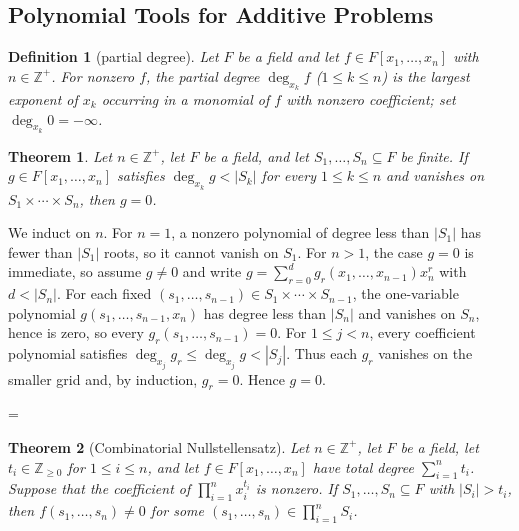 \documentclass[11pt]{article}
\makeatletter
\theoremstyle{ntstyle}
\newtheorem{theorem}{Theorem}[subsection]
\newtheorem{definition}{Definition}[subsection]
\let\nt@closedisplay\]
\def\nt@guardedclose{\@ifnextchar\par{\nt@closeafterpar}{\@ifnextchar\end{\postdisplaypenalty\@M\nt@closedisplay}{\nt@closedisplay}}}
\def\nt@closeafterpar\par{\@ifnextchar\par{\nt@closeafterpar}{\@ifnextchar\end{\postdisplaypenalty\@M\nt@closedisplay\par}{\nt@closedisplay\par}}}
\renewenvironment{proof}[1][\proofname]{\par
  \pushQED{\qed}\normalfont\topsep\medskipamount\edef\nt@afterproof{\@endparpenalty=\the\@endparpenalty\relax}\@beginparpenalty\@M\@endparpenalty\@M\let\]\nt@guardedclose\trivlist\item[]\textit{#1\@addpunct{.}} \ignorespaces}{\ifvmode\addpenalty\@M\fi\popQED\nt@afterproof\endtrivlist\@endpefalse}
\makeatother
\begin{document}
\subsection{Polynomial Tools for Additive Problems}

\begin{definition}[partial degree]\label{def:12.1.1} Let $F$ be a field and let
	$f\in F[x_1,\ldots,x_n]$ with $n\in\mathbb{Z}^+$. For nonzero $f$, the
	partial degree $\deg_{x_k}f$ ($1\le k\le n$) is the largest exponent of
	$x_k$ occurring in a monomial of $f$ with nonzero coefficient; set
	$\deg_{x_k}0=-\infty$.

\end{definition}
\begin{theorem}\label{thm:12.1.1} Let $n\in\mathbb{Z}^+$, let $F$ be a
	field, and let $S_1,\ldots,S_n\subseteq F$ be finite. If
	$g\in F[x_1,\ldots,x_n]$ satisfies $\deg_{x_k}g<|S_k|$ for every
	$1\le k\le n$ and vanishes on $S_1\times\cdots\times S_n$, then $g=0$.

\end{theorem}

\begin{proof} We induct on $n$. For $n=1$, a nonzero
	polynomial of degree less than $|S_1|$ has fewer than $|S_1|$ roots, so it cannot
	vanish on $S_1$. For $n>1$, the case $g=0$ is immediate, so assume
	$g\neq0$ and write
	$g=\sum_{r=0}^{d}g_r(x_1,\ldots,x_{n-1})x_n^{r}$ with $d<|S_n|$. For
	each fixed $(s_1,\ldots,s_{n-1})\in S_1\times\cdots\times S_{n-1}$,
	the one-variable polynomial $g(s_1,\ldots,s_{n-1},x_n)$ has degree less than $|S_n|$ and
	vanishes on $S_n$, hence is zero, so every
	$g_r(s_1,\ldots,s_{n-1})=0$. For $1\le j<n$, every coefficient
	polynomial satisfies $\deg_{x_j}g_r\le\deg_{x_j}g<|S_j|$. Thus each
	$g_r$ vanishes on the smaller grid and, by induction, $g_r=0$. Hence
	$g=0$.

\end{proof}
\begin{theorem}[Combinatorial Nullstellensatz]\label{thm:12.1.2} Let
	$n\in\mathbb{Z}^+$, let $F$ be a field, let
	$t_i\in\mathbb{Z}_{\ge0}$ for $1\le i\le n$, and let
	$f\in F[x_1,\ldots,x_n]$ have total degree
	$\sum_{i=1}^n t_i$. Suppose that the coefficient of $\prod_{i=1}^{n}x_i^{t_i}$
	is nonzero. If $S_1,\ldots,S_n\subseteq F$ with $|S_i| > t_i$, then
	$f(s_1,\ldots,s_n)\neq0$ for some
	$(s_1,\ldots,s_n)\in\prod_{i=1}^{n}S_i$.

\end{theorem}
\end{document}
